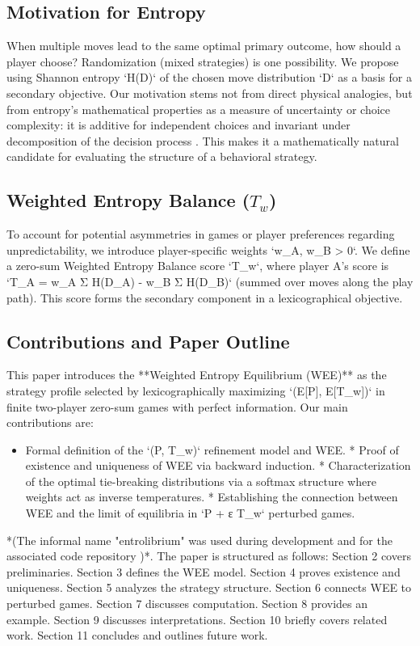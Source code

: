 \documentclass{article}
\begin{document}
\subsection{Motivation for Entropy}
When multiple moves lead to the same optimal primary outcome, how should a player choose? Randomization (mixed strategies) is one possibility. We propose using Shannon entropy `H(D)` of the chosen move distribution `D` as a basis for a secondary objective. Our motivation stems not from direct physical analogies, but from entropy's mathematical properties as a measure of uncertainty or choice complexity: it is additive for independent choices and invariant under decomposition of the decision process \cite{placeholder_shannon_properties}. This makes it a mathematically natural candidate for evaluating the structure of a behavioral strategy.

\subsection{Weighted Entropy Balance (\texorpdfstring{$T_w$}{Tw})}
To account for potential asymmetries in games or player preferences regarding unpredictability, we introduce player-specific weights `w_A, w_B > 0`. We define a zero-sum Weighted Entropy Balance score `T_w`, where player A's score is `T_A = w_A Σ H(D_A) - w_B Σ H(D_B)` (summed over moves along the play path). This score forms the secondary component in a lexicographical objective.

\subsection{Contributions and Paper Outline}
This paper introduces the **Weighted Entropy Equilibrium (WEE)** as the strategy profile selected by lexicographically maximizing `(E[P], E[T_w])` in finite two-player zero-sum games with perfect information. Our main contributions are:
\begin{itemize}
    \item Formal definition of the `(P, T_w)` refinement model and WEE.
    * Proof of existence and uniqueness of WEE via backward induction.
    * Characterization of the optimal tie-breaking distributions via a softmax structure where weights act as inverse temperatures.
    * Establishing the connection between WEE and the limit of equilibria in `P + ε T_w` perturbed games.
\end{itemize}
*(The informal name "entrolibrium" was used during development and for the associated code repository \cite{placeholder_repo})*.
The paper is structured as follows: Section 2 covers preliminaries. Section 3 defines the WEE model. Section 4 proves existence and uniqueness. Section 5 analyzes the strategy structure. Section 6 connects WEE to perturbed games. Section 7 discusses computation. Section 8 provides an example. Section 9 discusses interpretations. Section 10 briefly covers related work. Section 11 concludes and outlines future work.
\end{document}
